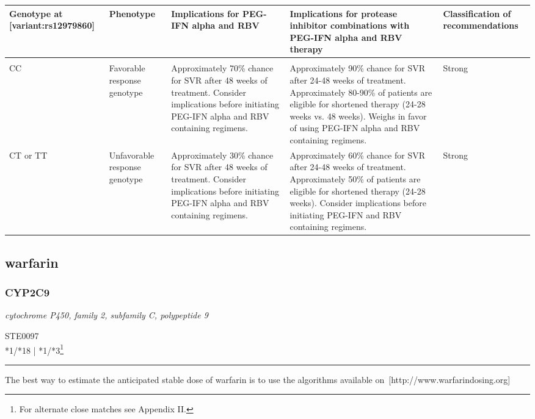 \documentclass{report}
\begin{document}
      \begin{tabularx}{\textwidth}{ XXXXX }
      \textbf{ Genotype at [variant:rs12979860] }&\textbf{ Phenotype }&\textbf{ Implications for PEG-IFN alpha and RBV  }&\textbf{ Implications for protease inhibitor combinations with PEG-IFN alpha and RBV therapy }&\textbf{ Classification of recommendations  } \\ \hline \\  CC & Favorable response genotype & Approximately 70\% chance for SVR  after 48 weeks of treatment. Consider implications before initiating PEG-IFN alpha and RBV containing regimens. & Approximately 90\% chance for SVR after 24-48 weeks of treatment. Approximately 80-90\% of patients are eligible for shortened therapy (24-28 weeks vs. 48 weeks). Weighs in favor of using PEG-IFN alpha and RBV containing regimens.& Strong  \\  CT or TT & Unfavorable response genotype & Approximately 30\% chance for SVR  after 48 weeks of treatment. Consider implications before initiating PEG-IFN alpha and RBV containing regimens. & Approximately 60\% chance for SVR after 24-48 weeks of treatment. Approximately 50\% of patients are eligible for shortened therapy (24-28 weeks). Consider implications before initiating PEG-IFN and RBV containing regimens.& Strong  \\ 
      \end{tabularx}
      
      \newpage
      \normalsize





















\subsection{ warfarin }

\subsubsection{ CYP2C9 }
     \textit{ cytochrome P450, family 2, subfamily C, polypeptide 9 } \begin{flushright} \textsc{ STE0097 \\ *1/*18  | *1/*3\footnote{For alternate close matches see Appendix II.} }\end{flushright}
      \hrule \vspace{6pt}
      The best way to estimate the anticipated stable dose of warfarin is to use the algorithms available on [http://www.warfarindosing.org] \newline
      \scriptsize
      
\end{document}
